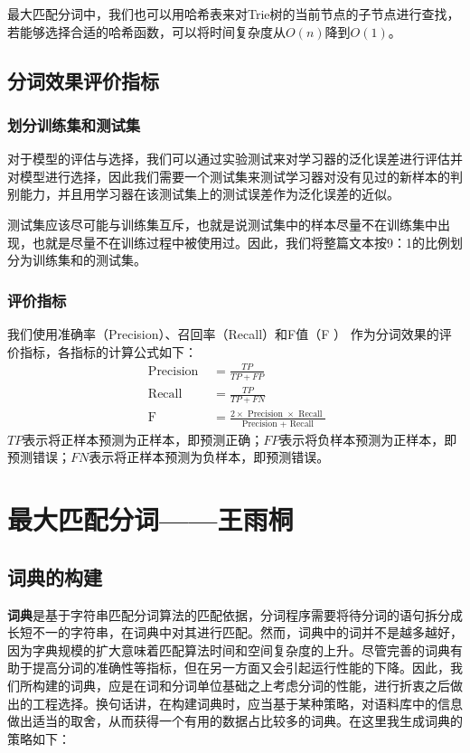 \documentclass[11pt,a4paper]{article}
\begin{document}
	最大匹配分词中，我们也可以用哈希表来对Trie树的当前节点的子节点进行查找，若能够选择合适的哈希函数，可以将时间复杂度从$O(n)$降到$O(1)$。
	
	
	\subsection{分词效果评价指标}
	
	\subsubsection{划分训练集和测试集}
	对于模型的评估与选择，我们可以通过实验测试来对学习器的泛化误差进行评估并对模型进行选择，因此我们需要一个测试集来测试学习器对没有见过的新样本的判别能力，并且用学习器在该测试集上的测试误差作为泛化误差的近似。
	
	测试集应该尽可能与训练集互斥，也就是说测试集中的样本尽量不在训练集中出现，也就是尽量不在训练过程中被使用过。因此，我们将整篇文本按9：1的比例划分为训练集和的测试集。
	
	\subsubsection{评价指标}\label{sxy:mec}
	我们使用准确率（Precision）、召回率（Recall）和F值（F ） 作为分词效果的评价指标，各指标的计算公式如下：
	\begin{equation}
		\begin{aligned}
			\text { Precision } &=\frac{T P}{T P+F P} \\
			\text { Recall } &=\frac{T P}{T P+F N} \\
			\text { F } &= \frac{2 \times \text { Precision } \times \text { Recall }}{ \text { Precision }+\text { Recall }}
		\end{aligned}
	\end{equation}
	$TP$表示将正样本预测为正样本，即预测正确；$FP$表示将负样本预测为正样本，即预测错误；$FN$表示将正样本预测为负样本，即预测错误。
	
	
	
	\section{最大匹配分词——王雨桐}
	\subsection{词典的构建}
	\noindent
	\textbf{词典}是基于字符串匹配分词算法的匹配依据，分词程序需要将待分词的语句拆分成长短不一的字符串，在词典中对其进行匹配。然而，词典中的词并不是越多越好，因为字典规模的扩大意味着匹配算法时间和空间复杂度的上升。尽管完善的词典有助于提高分词的准确性等指标，但在另一方面又会引起运行性能的下降。因此，我们所构建的词典，应是在词和分词单位基础之上考虑分词的性能，进行折衷之后做出的工程选择。换句话讲，在构建词典时，应当基于某种策略，对语料库中的信息做出适当的取舍，从而获得一个有用的数据占比较多的词典。在这里我生成词典的策略如下：
	
\end{document}
